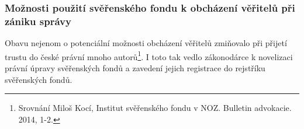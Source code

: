 \documentclass{article}
\begin{document}






\subsubsection{Možnosti použití svěřenského fondu k obcházení věřitelů při zániku správy}

Obavu nejenom o potenciální možnosti obcházení věřitelů zmiňovalo při přijetí trustu do české právní mnoho autorů\footnote{Srovnání Miloš Kocí, Institut svěřenského fondu v NOZ. Bulletin advokacie. 2014, 1-2.}. I toto tak vedlo zákonodárce k novelizaci právní úpravy svěřenských fondů a zavedení jejich registrace do rejstříku svěřenských fondů.\\
\end{document}
